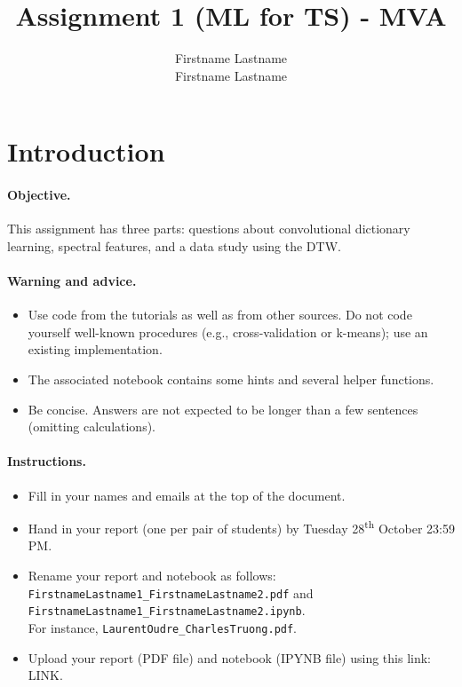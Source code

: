 \documentclass[11pt]{article}
\title{Assignment 1 (ML for TS) - MVA}
\author{
Firstname Lastname \email{youremail1@mail.com} \\ %
Firstname Lastname \email{youremail2@mail.com} %
}
\begin{document}
\maketitle

\section{Introduction}

\paragraph{Objective.} This assignment has three parts: questions about convolutional dictionary learning, spectral features, and a data study using the DTW. 

\paragraph{Warning and advice.} 
\begin{itemize}
    \item Use code from the tutorials as well as from other sources. Do not code yourself well-known procedures (e.g., cross-validation or k-means); use an existing implementation. 
    \item The associated notebook contains some hints and several helper functions.
    \item Be concise. Answers are not expected to be longer than a few sentences (omitting calculations).
\end{itemize}



\paragraph{Instructions.}
\begin{itemize}
    \item Fill in your names and emails at the top of the document.
    \item Hand in your report (one per pair of students) by Tuesday 28\textsuperscript{th} October 23:59 PM.
    \item Rename your report and notebook as follows:\\ \texttt{FirstnameLastname1\_FirstnameLastname2.pdf} and\\ \texttt{FirstnameLastname1\_FirstnameLastname2.ipynb}.\\
    For instance, \texttt{LaurentOudre\_CharlesTruong.pdf}.
    \item Upload your report (PDF file) and notebook (IPYNB file) using this link: \footnotesize{LINK}.
\end{itemize}
\end{document}
